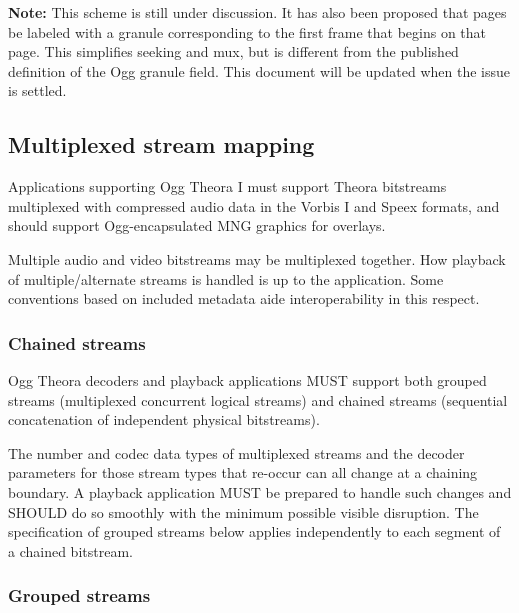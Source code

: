 \documentclass[11pt,letterpaper]{article}
\begin{document}
{\bf Note:}
This scheme is still under discussion.
It has also been proposed that pages be labeled with a granule corresponding to
 the first frame that begins on that page.
This simplifies seeking and mux, but is different from the published
 definition of the Ogg granule field.
This document will be updated when the issue is settled.


\subsection{Multiplexed stream mapping}

Applications supporting Ogg Theora I must support Theora bitstreams
 multiplexed with compressed audio data in the Vorbis I and Speex
 formats, and should support Ogg-encapsulated MNG graphics for overlays.

Multiple audio and video bitstreams may be multiplexed together.
How playback of multiple/alternate streams is handled is up to the
 application.
Some conventions based on included metadata aide interoperability
 in this respect.

\subsubsection{Chained streams}

Ogg Theora decoders and playback applications MUST support both grouped
 streams (multiplexed concurrent logical streams) and chained streams
 (sequential concatenation of independent physical bitstreams).

The number and codec data types of multiplexed streams and the decoder
 parameters for those stream types that re-occur can all change at a
 chaining boundary.
A playback application MUST be prepared to handle such changes and
 SHOULD do so smoothly with the minimum possible visible disruption.
The specification of grouped streams below applies independently to each
 segment of a chained bitstream.

\subsubsection{Grouped streams}
\end{document}
